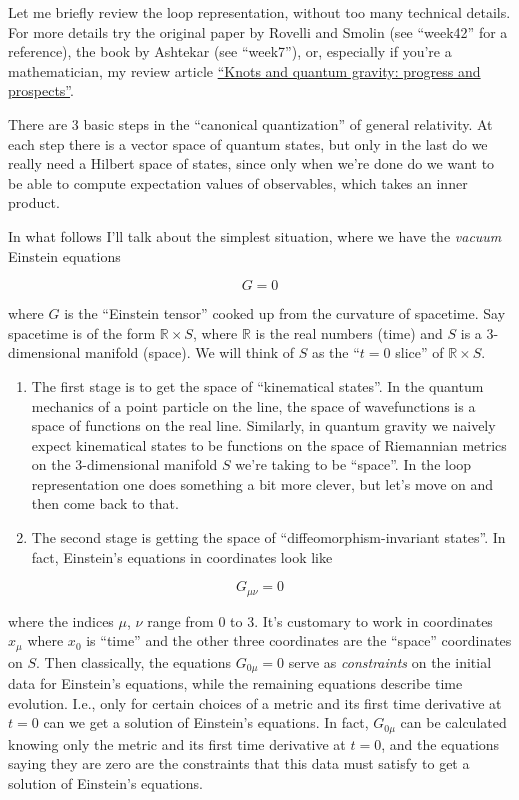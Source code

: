 \documentclass{article}
\begin{document}
Let me briefly review the loop representation, without too many
technical details. For more details try the original paper by Rovelli
and Smolin (see ``week42'' for a reference), the book by Ashtekar (see
``week7''), or, especially if you're a mathematician, my review article
\href{http://math.ucr.edu/home/baez/knot.ps}{``Knots and quantum
gravity: progress and prospects''}.

There are 3 basic steps in the ``canonical quantization'' of general
relativity. At each step there is a vector space of quantum states, but
only in the last do we really need a Hilbert space of states, since only
when we're done do we want to be able to compute expectation values of
observables, which takes an inner product.

In what follows I'll talk about the simplest situation, where we have
the \emph{vacuum} Einstein equations

\[G = 0\]

where \(G\) is the ``Einstein tensor'' cooked up from the curvature of
spacetime. Say spacetime is of the form \(\mathbb{R} \times S\), where
\(\mathbb{R}\) is the real numbers (time) and \(S\) is a 3-dimensional
manifold (space). We will think of \(S\) as the ``\(t = 0\) slice'' of
\(\mathbb{R} \times S\).

\begin{enumerate}
\def\labelenumi{\Roman{enumi})}
\item
  The first stage is to get the space of ``kinematical states''. In the
  quantum mechanics of a point particle on the line, the space of
  wavefunctions is a space of functions on the real line. Similarly, in
  quantum gravity we naively expect kinematical states to be functions
  on the space of Riemannian metrics on the 3-dimensional manifold \(S\)
  we're taking to be ``space''. In the loop representation one does
  something a bit more clever, but let's move on and then come back to
  that.
\item
  The second stage is getting the space of ``diffeomorphism-invariant
  states''. In fact, Einstein's equations in coordinates look like
\end{enumerate}

\[G_{\mu \nu} = 0\]

where the indices \(\mu\), \(\nu\) range from 0 to 3. It's customary to
work in coordinates \(x_{\mu}\) where \(x_0\) is ``time'' and the other
three coordinates are the ``space'' coordinates on \(S\). Then
classically, the equations \(G_{0 \mu} = 0\) serve as \emph{constraints}
on the initial data for Einstein's equations, while the remaining
equations describe time evolution. I.e., only for certain choices of a
metric and its first time derivative at \(t = 0\) can we get a solution
of Einstein's equations. In fact, \(G_{0 \mu}\) can be calculated
knowing only the metric and its first time derivative at \(t = 0\), and
the equations saying they are zero are the constraints that this data
must satisfy to get a solution of Einstein's equations.
\end{document}
